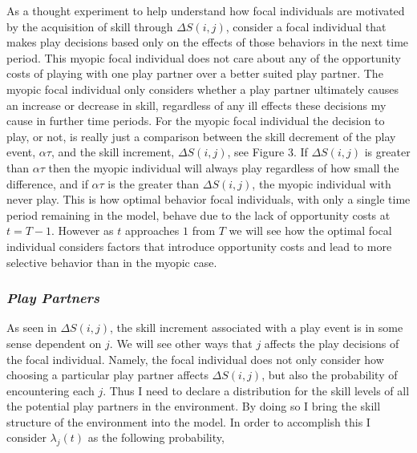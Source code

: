 \documentclass[12pt,letterpaper]{article}
\begin{document}
      As a thought experiment to help understand how focal individuals are motivated by the acquisition of skill through $\Delta S(i,j)$, consider a focal individual that makes play decisions based only on the effects of those behaviors in the next time period.
      This myopic focal individual does not care about any of the opportunity costs of playing with one play partner over a better suited play partner. 
      The myopic focal individual only considers whether a play partner ultimately causes an increase or decrease in skill, regardless of any ill effects these decisions my cause in further time periods. 
      For the myopic focal individual the decision to play, or not, is really just a comparison between the skill decrement of the play event, $\alpha \tau$, and the skill increment, $\Delta S(i,j)$, see Figure 3.
      If $\Delta S(i,j)$ is greater than $\alpha \tau$ then the myopic individual will always play regardless of how small the difference, and if $\alpha \tau$ is the greater than $\Delta S(i,j)$, the myopic individual with never play.   
      This is how optimal behavior focal individuals, with only a single time period remaining in the model, behave due to the lack of opportunity costs at $t=T-1$. %
      However as $t$ approaches $1$ from $T$ we will see how the optimal focal individual considers factors that introduce opportunity costs and lead to more selective behavior than in the myopic case.   
          
    \subsubsection{\it Play Partners}
      As seen in $\Delta S(i,j)$, the skill increment associated with a play event is in some sense dependent on $j$. 
      We will see other ways that $j$ affects the play decisions of the focal individual. 
      Namely, the focal individual does not only consider how choosing a particular play partner affects $\Delta S(i,j)$, but also the probability of encountering each $j$. %
      Thus I need to declare a distribution for the skill levels of all the potential play partners in the environment.
      By doing so I bring the skill structure of the environment into the model.
      In order to accomplish this I consider $\lambda_j(t)$ as the following probability,  %
      
\end{document}
